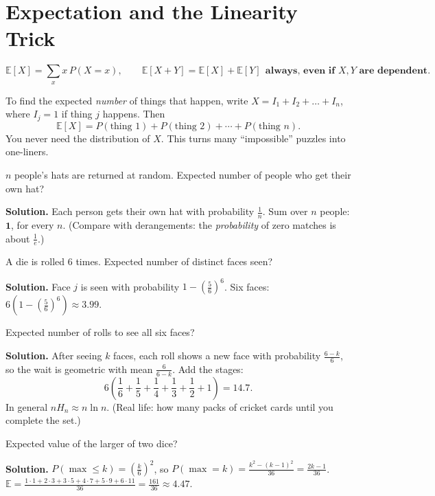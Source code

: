 \documentclass[11pt,a4paper,openany]{report}
\newcommand{\E}{\mathbb{E}}
\begin{document}
\chapter{Expectation and the Linearity Trick}\label{ch:exp}

\[\E[X]=\sum_x x\,P(X=x),\qquad \E[X+Y]=\E[X]+\E[Y]\ \ \textbf{always, even if $X,Y$ are dependent}.\]

\begin{idea}
To find the expected \emph{number} of things that happen, write $X=I_1+I_2+\dots+I_n$, where $I_j=1$ if thing $j$ happens. Then
\[\E[X]=P(\text{thing 1})+P(\text{thing 2})+\cdots+P(\text{thing }n).\]
You never need the distribution of $X$. This turns many ``impossible'' puzzles into one-liners.
\end{idea}

\begin{example}
$n$ people's hats are returned at random. Expected number of people who get their own hat?

\textbf{Solution.} Each person gets their own hat with probability $\frac1n$. Sum over $n$ people: $\mathbf1$, for every $n$. (Compare with derangements: the \emph{probability} of zero matches is about $\frac1e$.)
\end{example}

\begin{example}
A die is rolled 6 times. Expected number of distinct faces seen?

\textbf{Solution.} Face $j$ is seen with probability $1-\left(\frac56\right)^6$. Six faces: $6\left(1-\left(\frac56\right)^6\right)\approx\mathbf{3.99}$.
\end{example}

\begin{example}
Expected number of rolls to see all six faces?

\textbf{Solution.} After seeing $k$ faces, each roll shows a new face with probability $\frac{6-k}6$, so the wait is geometric with mean $\frac6{6-k}$. Add the stages:
\[6\left(\frac16+\frac15+\frac14+\frac13+\frac12+1\right)=\mathbf{14.7}.\]
In general $nH_n\approx n\ln n$. (Real life: how many packs of cricket cards until you complete the set.)
\end{example}

\begin{example}
Expected value of the larger of two dice?

\textbf{Solution.} $P(\max\le k)=\left(\frac k6\right)^2$, so $P(\max=k)=\frac{k^2-(k-1)^2}{36}=\frac{2k-1}{36}$.
$\E=\frac{1\cdot1+2\cdot3+3\cdot5+4\cdot7+5\cdot9+6\cdot11}{36}=\frac{161}{36}\approx\mathbf{4.47}$.
\end{example}
\end{document}
